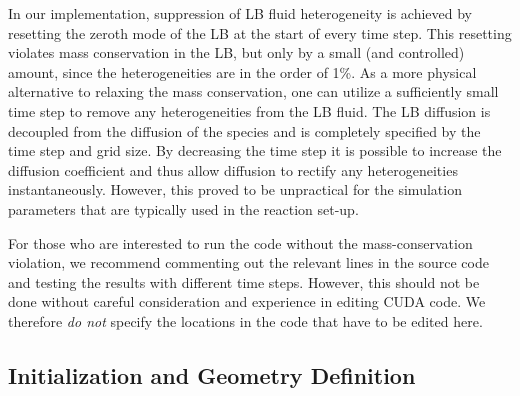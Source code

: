 In our implementation, suppression of LB fluid heterogeneity is achieved by 
resetting the zeroth mode of the LB at the start of every time step. This 
resetting violates mass conservation in the LB, but only by a small (and 
controlled) amount, since the heterogeneities are in the order of 1\%. 
As a more physical alternative to relaxing the mass conservation, one can 
utilize a sufficiently small time step to remove any heterogeneities from the LB
fluid. The LB diffusion is decoupled from the diffusion of the species and is
completely specified by the time step and grid size. By decreasing the time step
it is possible to increase the diffusion coefficient and thus allow diffusion to
rectify any heterogeneities instantaneously. However, this proved to be 
unpractical for the simulation parameters that are typically used in the
reaction set-up. 

For those who are interested to run the code without the mass-conservation
violation, we recommend commenting out the relevant lines in the source code and
testing the results with different time steps. However, this should not be done
without careful consideration and experience in editing CUDA code. We therefore
\emph{do not} specify the locations in the code that have to be edited here.

\subsection{\label{ssec:ek-reac-init}Initialization and Geometry Definition}

